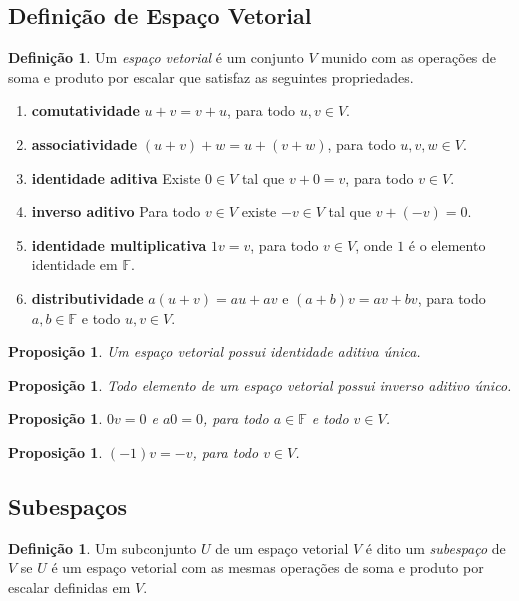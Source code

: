\documentclass[12pt]{article}
\theoremstyle{plain}
\newtheorem{prop}[thm]{Proposição}
\theoremstyle{definition}
\newtheorem{defn}[thm]{Definição}
\theoremstyle{remark}
\begin{document}
\subsection{Definição de Espaço Vetorial}
\begin{defn}
    Um \emph{espaço vetorial} é um conjunto \(V\) munido com as operações de soma e produto por escalar que satisfaz as seguintes propriedades.
    \begin{enumerate}
        \item[(A1)] \textbf{comutatividade} \(u + v = v + u\), para todo \(u, v \in V\).
        \item[(A2)] \textbf{associatividade} \((u + v) + w = u + (v + w)\), para todo \(u, v, w \in V\).
        \item[(A3)] \textbf{identidade aditiva} Existe \(0 \in V\) tal que \(v + 0 = v\), para todo \(v \in V\).
        \item[(A4)] \textbf{inverso aditivo} Para todo \(v \in V\) existe \(-v \in V\) tal que \(v + (-v) = 0\).
        \item[(A5)] \textbf{identidade multiplicativa} \(1v = v\), para todo \(v \in V\), onde \(1\) é o elemento identidade em \(\mathbb{F}\).
        \item[(A6)] \textbf{distributividade} \(a(u + v) = au + av\) e \((a+b)v=av + bv\), para todo \(a, b \in \mathbb{F}\) e todo \(u, v \in V\).
    \end{enumerate}
\end{defn}

\begin{prop}
    Um espaço vetorial possui identidade aditiva única.
\end{prop}

\begin{prop}
    Todo elemento de um espaço vetorial possui inverso aditivo único.
\end{prop}

\begin{prop}
    \(0v = 0\) e \(a0 = 0\), para todo \(a \in \mathbb{F}\) e todo \(v \in V\).
\end{prop}

\begin{prop}
    \((-1)v = -v\), para todo \(v \in V\).
\end{prop}

\subsection{Subespaços}
\begin{defn}
    Um subconjunto \(U\) de um espaço vetorial \(V\) é dito um \emph{subespaço} de \(V\) se \(U\) é um espaço vetorial com as mesmas operações de soma e produto por escalar definidas em \(V\).
\end{defn}
\end{document}
